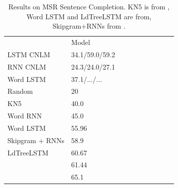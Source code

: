 \begin{table}[t]
  \begin{center}
    \begin{tabular}{l|l|l|l|llllll}
      \multicolumn{1}{c}{}& Model \\
LSTM CNLM	    &      34.1/59.0/59.2 \\
	    RNN CNLM &     24.3/24.0/27.1 \\
	    Word LSTM & 37.1/.../... \\ \hline
	    Random & 20 \\
	    KN5   & 40.0 \\
            Word RNN & 45.0 \\
	    Word LSTM  & 55.96 \\
Skipgram + RNNs  & 58.9 \\
LdTreeLSTM  & 60.67 \\
            \citet{woods2016exploiting} &  61.44 \\
\citet{melamud2016context2vec} & 65.1 \\
    \end{tabular}
  \end{center}
  \caption{\label{tab:msr-completion-results} Results on MSR Sentence Completion. KN5 is from \cite{Mikolov:2012}, Word LSTM and LdTreeLSTM are from\cite{zhang2016top}, Skipgram+RNNs from \cite{Mikolov:etal:2013b}.}
\end{table}




